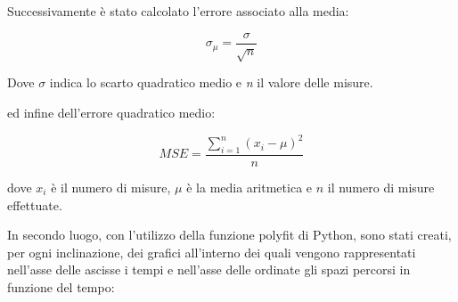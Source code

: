 \documentclass[a4paper,11pt,titlepage]{book}
\begin{document}
\begin{flushleft}
Successivamente è stato calcolato l'errore associato alla media:
\end{flushleft}
\vspace{0.5cm}


\begin{equation}
\sigma_\mu=\frac{\sigma }{\sqrt{n}}
\end{equation}


\vspace{0.5cm}


\begin{flushleft}
Dove $\sigma$ indica lo scarto quadratico medio e \textit{n} il valore delle misure.\\
\end{flushleft}
\vspace{0.5cm}


\begin{flushleft}
ed infine dell’errore quadratico medio:
\end{flushleft}


\begin{equation}
MSE=\dfrac{\sum\limits_{i=1}^n(x_i-\mu)^2}{n}
\end{equation}
\vspace{0.2cm}

\begin{flushleft}
dove $x_i$ è il numero di misure, $\mu$ è la media aritmetica e $n$ il numero di misure effettuate.
\end{flushleft}
\newpage


\begin{flushleft}
In secondo luogo, con l’utilizzo della funzione polyfit di Python, sono stati creati, per ogni inclinazione, dei grafici all’interno dei quali vengono rappresentati nell’asse delle ascisse i tempi e nell’asse delle ordinate gli spazi percorsi in funzione del tempo:
\end{flushleft}



\begin{figure}[h!]
\hspace{0.2cm}
\\
\hspace{0.2cm}
\end{figure}
\vspace{0.5cm}
\end{document}
